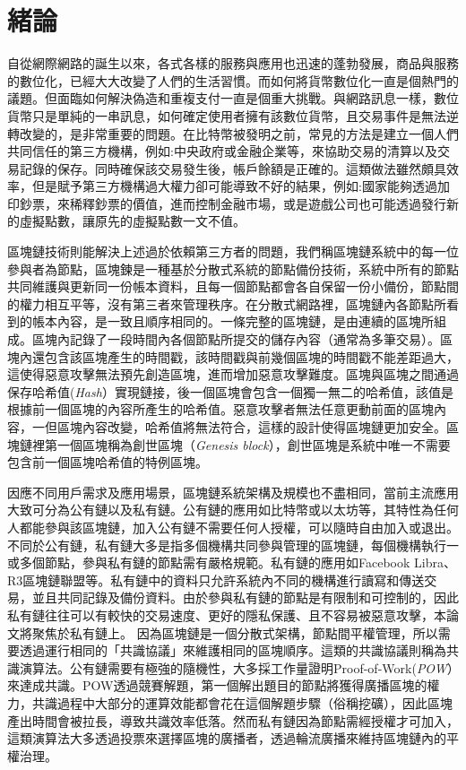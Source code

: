 
\chapter{緒論}
自從網際網路的誕生以來，各式各樣的服務與應用也迅速的蓬勃發展，商品與服務的數位化，已經大大改變了人們的生活習慣。而如何將貨幣數位化一直是個熱門的議題。但面臨如何解決偽造和重複支付一直是個重大挑戰。與網路訊息一樣，數位貨幣只是單純的一串訊息，如何確定使用者擁有該數位貨幣，且交易事件是無法逆轉改變的，是非常重要的問題。在比特幣\cite{Bitcoin}被發明之前，常見的方法是建立一個人們共同信任的第三方機構，例如:中央政府或金融企業等，來協助交易的清算以及交易記錄的保存。同時確保該交易發生後，帳戶餘額是正確的。這類做法雖然頗具效率，但是賦予第三方機構過大權力卻可能導致不好的結果，例如:國家能夠透過加印鈔票，來稀釋鈔票的價值，進而控制金融市場，或是遊戲公司也可能透過發行新的虛擬點數，讓原先的虛擬點數一文不值。

區塊鏈技術則能解決上述過於依賴第三方者的問題，我們稱區塊鏈系統中的每一位參與者為節點，區塊鍊是一種基於分散式系統的節點備份技術，系統中所有的節點共同維護與更新同一份帳本資料，且每一個節點都會各自保留一份小備份，節點間的權力相互平等，沒有第三者來管理秩序。在分散式網路裡，區塊鏈內各節點所看到的帳本內容，是一致且順序相同的。一條完整的區塊鏈，是由連續的區塊所組成。區塊內記錄了一段時間內各個節點所提交的儲存內容（通常為多筆交易）。區塊內還包含該區塊產生的時間戳，該時間戳與前幾個區塊的時間戳不能差距過大，這使得惡意攻擊無法預先創造區塊，進而增加惡意攻擊難度。區塊與區塊之間通過保存哈希值({\em Hash}）實現鏈接，後一個區塊會包含一個獨一無二的哈希值，該值是根據前一個區塊的內容所產生的哈希值。惡意攻擊者無法任意更動前面的區塊內容，一但區塊內容改變，哈希值將無法符合，這樣的設計使得區塊鏈更加安全。區塊鏈裡第一個區塊稱為創世區塊（{\em Genesis block}），創世區塊是系統中唯一不需要包含前一個區塊哈希值的特例區塊。


因應不同用戶需求及應用場景，區塊鏈系統架構及規模也不盡相同，當前主流應用大致可分為公有鏈以及私有鏈。公有鏈的應用如比特幣或以太坊\cite{Ethereum}等，其特性為任何人都能參與該區塊鏈，加入公有鏈不需要任何人授權，可以隨時自由加入或退出。不同於公有鏈，私有鏈大多是指多個機構共同參與管理的區塊鏈，每個機構執行一或多個節點，參與私有鏈的節點需有嚴格規範。私有鏈的應用如Facebook Libra、R3區塊鏈聯盟等。私有鏈中的資料只允許系統內不同的機構進行讀寫和傳送交易，並且共同記錄及備份資料。由於參與私有鏈的節點是有限制和可控制的，因此私有鏈往往可以有較快的交易速度、更好的隱私保護、且不容易被惡意攻擊，本論文將聚焦於私有鏈上。
因為區塊鏈是一個分散式架構，節點間平權管理，所以需要透過運行相同的「共識協議」來維護相同的區塊順序。這類的共識協議則稱為共識演算法。公有鏈需要有極強的隨機性，大多採工作量證明Proof-of-Work({\em POW}）來達成共識。POW透過競賽解題，第一個解出題目的節點將獲得廣播區塊的權力，共識過程中大部分的運算效能都會花在這個解題步驟（俗稱挖礦），因此區塊產出時間會被拉長，導致共識效率低落。然而私有鏈因為節點需經授權才可加入，這類演算法大多透過投票來選擇區塊的廣播者，透過輪流廣播來維持區塊鏈內的平權治理。

